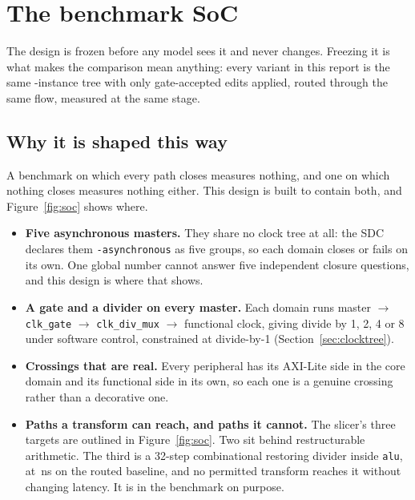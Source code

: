 \documentclass[11pt,a4paper]{article}
\begin{document}
\section{The benchmark SoC}

The design is frozen before any model sees it and never changes. Freezing it
is what makes the comparison mean anything: every variant in this report is
the same \baselineinstances-instance tree with only gate-accepted edits
applied, routed through the same flow, measured at the same stage.



\subsection{Why it is shaped this way}

A benchmark on which every path closes measures nothing, and one on which
nothing closes measures nothing either. This design is built to contain both,
and Figure~\ref{fig:soc} shows where.

\begin{itemize}
  \item \textbf{Five asynchronous masters.} They share no clock tree at
        all: the SDC declares them
        \texttt{-asynchronous} as five groups, so each domain closes or fails
        on its own. One global number cannot answer five
        independent closure questions, and this design is where that shows.
  \item \textbf{A gate and a divider on every master.} Each domain runs
        master $\rightarrow$ \texttt{clk\_gate} $\rightarrow$
        \texttt{clk\_div\_mux} $\rightarrow$ functional clock, giving divide
        by 1, 2, 4 or 8 under software control, constrained at divide-by-1
        (Section~\ref{sec:clocktree}).
  \item \textbf{Crossings that are real.} Every peripheral has its AXI-Lite
        side in the core domain and its functional side in its own, so each
        one is a genuine crossing rather than a decorative one.
  \item \textbf{Paths a transform can reach, and paths it cannot.} The
        slicer's three targets are outlined in Figure~\ref{fig:soc}. Two sit
        behind restructurable arithmetic. The third is a 32-step
        combinational restoring divider inside \texttt{alu}, at
        \baselinewns\,ns on the routed baseline, and no permitted transform
        reaches it without
        changing latency. It is in the benchmark on purpose.
\end{itemize}
\end{document}
